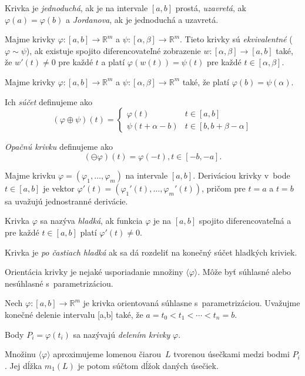 Krivka je {\em jednoduchá}, ak je na intervale $[a,b]$ prostá,
{\em uzavretá}, ak $\varphi(a)=\varphi(b)$ a {\em Jordanova}, ak
je jednoduchá a uzavretá.

\begin{definition}
	Majme krivky $\varphi: [a,b] \to \mathbb{R}^m$ a 
	$\psi : [\alpha, \beta] \to \mathbb{R}^m$. Tieto krivky
	sú {\em ekvivalentné} ($\varphi \sim \psi$), ak existuje 
	spojito diferencovateľné
	zobrazenie $w : [\alpha, \beta] \to [a,b]$ také, že
	$w'(t) \neq 0$ pre každé $t$ a platí
	$\varphi(w(t)) = \psi(t)$ pre každé $t \in [\alpha, \beta]$.
\end{definition}

\begin{definition}
	Majme krivky $\varphi: [a,b] \to \mathbb{R}^m$ a 
	$\psi : [\alpha, \beta] \to \mathbb{R}^m$ také, že platí
	$\varphi(b)=\psi(\alpha)$.
	
	Ich {\em súčet} definujeme ako 
	\[
		(\varphi \oplus \psi)(t) =
		\begin{cases}
			\varphi(t) & t \in [a,b] \\
			\psi(t+\alpha-b) & t \in [b, b + \beta - \alpha]
		\end{cases}
	\]
	
	{\em Opačnú krivku } definujeme ako
	\[
		(\ominus \varphi)(t) = \varphi(-t), t \in [-b, -a].
	\]
\end{definition}

\begin{definition}
	Majme krivku $\varphi=(\varphi_1, \ldots, \varphi_m)$ na intervale
	$[a,b]$. Deriváciou krivky v~bode $t \in [a,b]$ je vektor
	$\varphi'(t) = (\varphi_1'(t), \ldots, \varphi_m'(t))$, pričom pre $t=a$
	a $t=b$ sa uvažujú jednostranné derivácie.
\end{definition}

\begin{definition}
	Krivka $\varphi$ sa nazýva {\em hladká}, ak funkcia $\varphi$
	je na $[a,b]$ spojito diferencovateľná a pre každé $t \in [a,b]$
	platí $\varphi'(t) \neq 0$.
	
	Krivka je {\em po častiach hladká} ak sa dá rozdeliť na konečný 
	súčet hladkých kriviek.
\end{definition}

Orientácia krivky je nejaké usporiadanie množiny $\langle \varphi \rangle$.
Môže byť súhlasné alebo nesúhlasné s~parametrizáciou.

\begin{definition}
	Nech $\varphi : [a,b] \to \mathbb{R}^m$ je krivka orientovaná
	súhlasne s~parametrizáciou. Uvažujme konečné delenie intervalu [a,b] také, že
	$a=t_0 < t_1 < \cdots < t_n = b$. 
	
	Body $P_i = \varphi(t_i)$ sa nazývajú {\em delením krivky} $\varphi$.
	
	Množinu $\langle \varphi \rangle$ aproximujeme lomenou čiarou~$L$
	tvorenou úsečkami medzi bodmi $P_i$. Jej dĺžka $m_1(L)$ je potom 
	súčtom dĺžok daných úsečiek.
\end{definition}

